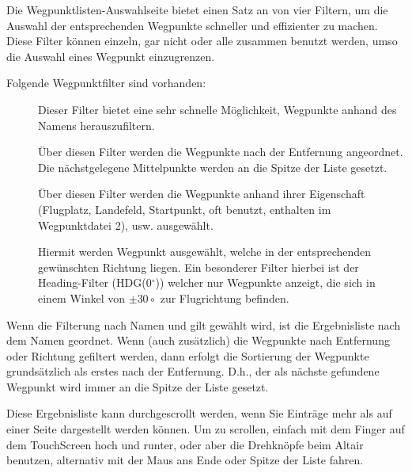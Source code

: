 
Die Wegpunktlisten-Auswahlseite bietet einen Satz an von vier Filtern, um die Auswahl der entsprechenden  Wegpunkte schneller und effizienter zu machen. Diese Filter können einzeln, gar nicht oder alle zusammen benutzt werden, umso die Auswahl eines Wegpunkt  einzugrenzen.

Folgende Wegpunktfilter sind vorhanden:

\begin{description}
\item[] Dieser Filter bietet eine sehr schnelle Möglichkeit, Wegpunkte anhand des Namens herauszufiltern.
\item[] Über diesen Filter werden die Wegpunkte nach der Entfernung angeordnet. Die nächstgelegene 
Mittelpunkte werden an die Spitze der Liste gesetzt.
\item[] Über diesen Filter werden die Wegpunkte anhand ihrer Eigenschaft (Flugplatz, Landefeld, Startpunkt, oft benutzt, enthalten im Wegpunktdatei 2), usw. ausgewählt.
\item[] Hiermit werden Wegpunkt ausgewählt, welche in der entsprechenden gewünschten Richtung liegen. Ein besonderer Filter hierbei ist der Heading-Filter (\textsf{HDG(0$^\circ$)}) welcher nur Wegpunkte anzeigt, die sich in einem Winkel von $\pm 30\circ$ zur Flugrichtung befinden.
\end{description}

Wenn die Filterung nach Namen und gilt gewählt wird, ist die Ergebnisliste nach dem Namen geordnet. Wenn (auch zusätzlich) die Wegpunkte nach Entfernung oder Richtung gefiltert werden, dann erfolgt die Sortierung der Wegpunkte grundsätzlich als erstes nach der Entfernung.
D.h., der als nächste gefundene Wegpunkt wird immer an die Spitze der Liste gesetzt.

Diese Ergebnisliste kann durchgescrollt werden, wenn Sie Einträge mehr als auf einer Seite dargestellt werden können. Um zu scrollen, einfach mit dem Finger auf dem TouchScreen hoch und runter, oder aber die Drehknöpfe beim Altair benutzen, alternativ mit der Maus ans Ende oder Spitze der Liste fahren.


